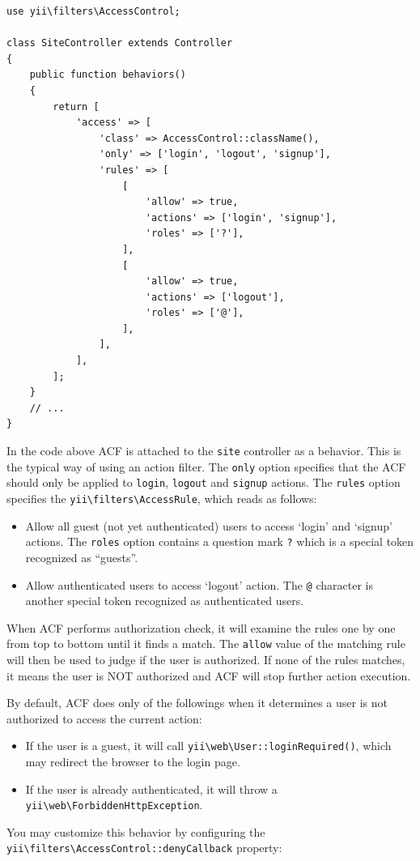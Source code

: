 \lstset{language=php}\begin{lstlisting}
use yii\filters\AccessControl;

class SiteController extends Controller
{
    public function behaviors()
    {
        return [
            'access' => [
                'class' => AccessControl::className(),
                'only' => ['login', 'logout', 'signup'],
                'rules' => [
                    [
                        'allow' => true,
                        'actions' => ['login', 'signup'],
                        'roles' => ['?'],
                    ],
                    [
                        'allow' => true,
                        'actions' => ['logout'],
                        'roles' => ['@'],
                    ],
                ],
            ],
        ];
    }
    // ...
}
\end{lstlisting}
In the code above ACF is attached to the \lstinline|site| controller as a behavior. This is the typical way of using an action
filter. The \lstinline|only| option specifies that the ACF should only be applied to \lstinline|login|, \lstinline|logout| and \lstinline|signup| actions.
The \lstinline|rules| option specifies the \texttt{yii{\allowbreak{}\textbackslash}filters{\allowbreak{}\textbackslash}AccessRule}, which reads as follows:

\begin{itemize}
\item Allow all guest (not yet authenticated) users to access `login' and `signup' actions. The \lstinline|roles| option
contains a question mark \lstinline|?| which is a special token recognized as ``guests''.
\item Allow authenticated users to access `logout' action. The \lstinline|@| character is another special token recognized as
authenticated users.
\end{itemize}
When ACF performs authorization check, it will examine the rules one by one from top to bottom until it finds
a match. The \lstinline|allow| value of the matching rule will then be used to judge if the user is authorized. If none
of the rules matches, it means the user is NOT authorized and ACF will stop further action execution.

By default, ACF does only of the followings when it determines a user is not authorized to access the current action:

\begin{itemize}
\item If the user is a guest, it will call \texttt{yii{\allowbreak{}\textbackslash}web{\allowbreak{}\textbackslash}User\allowbreak{}::\allowbreak{}loginRequired()}, which may redirect the browser to the login page.
\item If the user is already authenticated, it will throw a \texttt{yii{\allowbreak{}\textbackslash}web{\allowbreak{}\textbackslash}ForbiddenHttpException}.
\end{itemize}
You may customize this behavior by configuring the \texttt{yii{\allowbreak{}\textbackslash}filters{\allowbreak{}\textbackslash}AccessControl\allowbreak{}::\allowbreak{}denyCallback} property:

